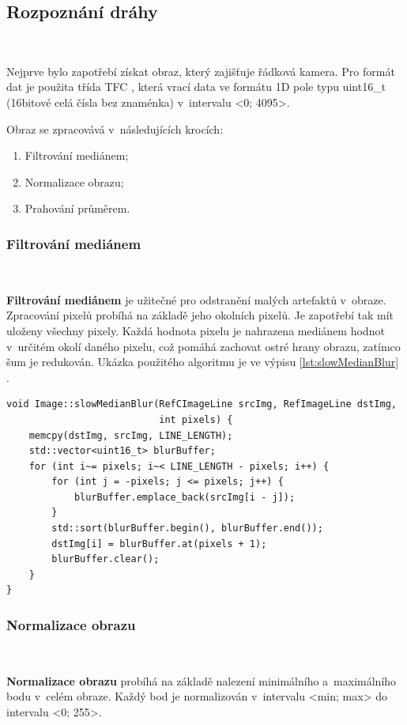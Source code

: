 \subsection{Rozpoznání dráhy}\

Nejprve bylo zapotřebí získat obraz, který zajišťuje řádková kamera. Pro formát dat
je použita třída TFC \cite{draha}, která vrací data ve formátu 1D pole typu 
uint16\_t (16bitové celá čísla bez znaménka) v~intervalu <0; 4095>.

Obraz se zpracovává v~následujících krocích:
\begin{enumerate}
    \item Filtrování mediánem;
    \item Normalizace obrazu;
    \item Prahování průměrem.
\end{enumerate}

\subsubsection*{Filtrování mediánem}\

\textbf{Filtrování mediánem} je užitečné pro odstranění malých artefaktů v~obraze.
Zpracování pixelů probíhá na základě jeho okolních pixelů. Je zapotřebí tak mít
uloženy všechny pixely. Každá hodnota pixelu je nahrazena mediánem hodnot v~určitém
okolí daného pixelu, což pomáhá zachovat ostré hrany obrazu, zatímco šum je
redukován. Ukázka použitého algoritmu je ve výpisu \ref{lst:slowMedianBlur} 
\cite{draha}\cite{robot}.

\begin{lstlisting}[caption = Filtrování mediánem, label = lst:slowMedianBlur]
void Image::slowMedianBlur(RefCImageLine srcImg, RefImageLine dstImg,
                           int pixels) {
    memcpy(dstImg, srcImg, LINE_LENGTH);
    std::vector<uint16_t> blurBuffer;
    for (int i~= pixels; i~< LINE_LENGTH - pixels; i++) {
        for (int j = -pixels; j <= pixels; j++) {
            blurBuffer.emplace_back(srcImg[i - j]);
        }
        std::sort(blurBuffer.begin(), blurBuffer.end());
        dstImg[i] = blurBuffer.at(pixels + 1);
        blurBuffer.clear();
    }
}
\end{lstlisting}

\subsubsection*{Normalizace obrazu}\

\textbf{Normalizace obrazu} probíhá na základě nalezení minimálního a~maximálního
bodu v~celém obraze. Každý bod je normalizován v~intervalu <min; max> do intervalu
<0; 255>.

